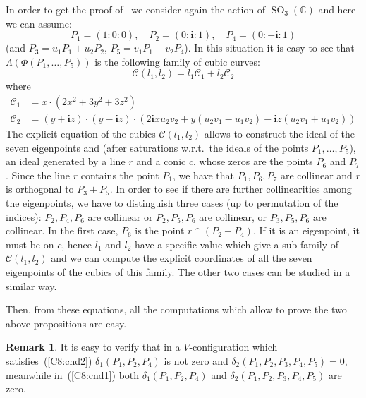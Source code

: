 \documentclass{amsart}
\theoremstyle{plain}
\theoremstyle{definition}
\newtheorem{rmk}[lemma]{Remark}
\newcommand{\C}{\mathbb{C}}
\newcommand{\SO}{\operatorname{SO}}
\newcommand{\iii}{\textbf{i}}
\begin{document}
In order to get the proof of~
we consider again the action of $\SO_3(\C)$ and here we can assume:
\[
P_1 = (1: 0: 0), \quad P_2 = (0: \iii: 1), \quad P_4 = (0: -\iii: 1)
\]
(and $P_3 = u_1P_1+u_2P_2$, $P_5 = v_1P_1+v_2P_4$). In this situation it
is easy to see that $\Lambda(\Phi(P_1, \dots, P_5))$
is the following family of cubic curves:
\[
\mathcal{C}(l_1, l_2) = l_1\mathcal{C}_1+l_2\mathcal{C}_2
\]
where
\begin{align*}
  \mathcal{C}_1 & = x \cdot \left(2x^{2} + 3 y^{2} + 3 z^{2}\right)\\
  \mathcal{C}_2 & = (y + \iii z) \cdot (y - \iii z)
\cdot \left(2 \iii x u_{2} v_{2} + y (u_{2} v_{1}- u_{1} v_{2})
- \iii z (u_{2} v_{1}  + u_{1} v_{2})\right)
\end{align*}
The explicit equation of the cubics $\mathcal{C}(l_1, l_2)$ allows to
construct the ideal of the seven eigenpoints and (after
saturations w.r.t.\ the ideals of the points $P_1, \dotsc, P_5$),
an ideal generated by a line $r$ and a conic $c$, whose zeros are
the points $P_6$ and $P_7$. Since the line $r$ contains the point $P_1$,
we have that $P_1, P_6, P_7$ are collinear and $r$ is orthogonal to
$P_3+P_5$. In order to see if there are further collinearities among the
eigenpoints, we have to distinguish three cases (up to permutation
of the indices): $P_2, P_4, P_6$ are collinear or $P_2, P_5, P_6$ are
collinear, or $P_3, P_5, P_6$ are collinear. In the first case, $P_6$
is the point $r \cap (P_2+P_4)$. If it is an eigenpoint, it must be
on $c$, hence $l_1$ and $l_2$ have a specific value which give a sub-family
of $\mathcal{C}(l_1, l_2)$ and we can compute the explicit coordinates of
all the seven eigenpoints of the cubics of this family. The other two
cases can be studied in a similar way.

Then, from these equations, all the computations which allow to prove
the two above propositions are easy.
%
\begin{rmk}
\label{rmk:delta1_and_delta2}
It is easy to verify that in 
a $V$-configuration which satisfies~(\ref{C8:cnd2})
$\delta_1(P_1, P_2, P_4)$ is not zero and
$\delta_2(P_1, P_2, P_3, P_4, P_5) = 0$,
meanwhile in~(\ref{C8:cnd1}) both $\delta_1(P_1, P_2, P_4)$ and
$\delta_2(P_1, P_2, P_3, P_4, P_5)$ are zero.
\end{rmk}
\end{document}
